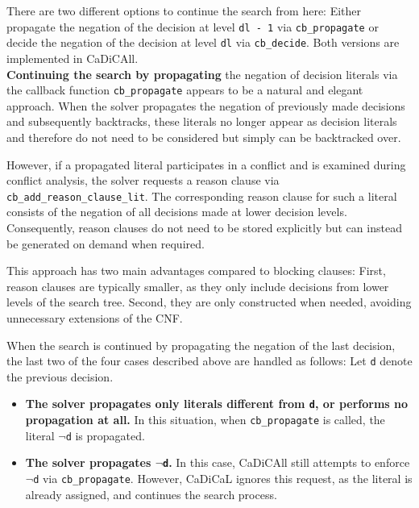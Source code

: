 \documentclass[12pt,a4paper]{article}
\begin{document}
There are two different options to continue the search from here: Either propagate the negation of the decision at level \verb|dl - 1| via \verb|cb_propagate| or decide the negation of the decision at level \verb|dl| via \verb|cb_decide|. Both versions are implemented in CaDiCAll. \\

\noindent
\textbf{Continuing the search by propagating} the negation of decision literals via the callback function \verb|cb_propagate| appears to be a natural and elegant approach. When the solver propagates the negation of previously made decisions and subsequently backtracks, these literals no longer appear as decision literals and therefore do not need to be considered but simply can be backtracked over.

However, if a propagated literal participates in a conflict and is examined during conflict analysis, the solver requests a reason clause via \verb|cb_add_reason_clause_lit|. The corresponding reason clause for such a literal consists of the negation of all decisions made at lower decision levels. Consequently, reason clauses do not need to be stored explicitly but can instead be generated on demand when required.

This approach has two main advantages compared to blocking clauses: First, reason clauses are typically smaller, as they only include decisions from lower levels of the search tree. Second, they are only constructed when needed, avoiding unnecessary extensions of the CNF.

When the search is continued by propagating the negation of the last decision, the last two of the four cases described above are handled as follows: Let \verb|d| denote the previous decision.

\begin{itemize}

\item \textbf{The solver propagates only literals different from \texttt{d}, or performs no propagation at all.} In this situation, when \verb|cb_propagate| is called, the literal $\lnot$\verb|d| is propagated.

\item \textbf{The solver propagates \texttt{$\lnot$d}.} In this case, CaDiCAll still attempts to enforce $\lnot$\verb|d| via \verb|cb_propagate|. However, CaDiCaL ignores this request, as the literal is already assigned, and continues the search process.

\end{itemize}
\end{document}
